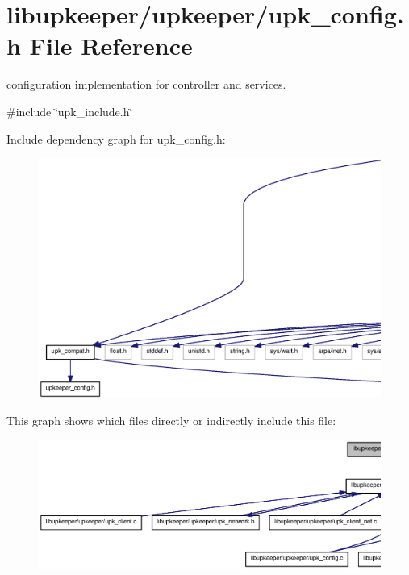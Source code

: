 \section{libupkeeper/upkeeper/upk\_\-config.h File Reference}
\label{upk__config_8h}


configuration implementation for controller and services.  


{\ttfamily \#include \char`\"{}upk\_\-include.h\char`\"{}}\par
Include dependency graph for upk\_\-config.h:\nopagebreak
\begin{figure}[H]
\begin{center}
\leavevmode
\includegraphics[width=400pt]{upk__config_8h__incl}
\end{center}
\end{figure}
This graph shows which files directly or indirectly include this file:
\nopagebreak
\begin{figure}[H]
\begin{center}
\leavevmode
\includegraphics[width=400pt]{upk__config_8h__dep__incl}
\end{center}
\end{figure}
